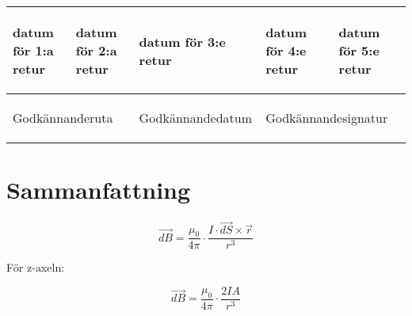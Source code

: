 \documentclass[a4paper,10pt]{article}
\def\firstret{}
\def\secondret{}
\def\thirdret{}
\def\fourthret{}
\def\fifthret{}
\begin{document}
\begin{titlepage}
\begin{center}
\begin{large}
\begin{tabular}{rl}
			\end{tabular}
		\end{large}
		\vfill
		\begin{small}
		\begin{tabular}{||p{20mm}|p{20mm}|p{20mm}|p{20mm}|p{20mm}||}\hline
			\begin{tiny} datum för 1:a retur\end{tiny} \firstret &
			\begin{tiny} datum för 2:a retur\end{tiny} \secondret &
			\begin{tiny} datum för 3:e retur\end{tiny} \thirdret &
			\begin{tiny} datum för 4:e retur\end{tiny} \fourthret &
			\begin{tiny} datum för 5:e retur\end{tiny} \fifthret \\[7mm] \hline
			\multicolumn{2}{||p{40mm}|}{\begin{tiny} Godkännanderuta\end{tiny}}  &
			\tiny{\begin{tiny} Godkännandedatum\end{tiny}} &
			\multicolumn{2}{|p{40mm}||}{\begin{tiny} Godkännandesignatur\end{tiny}} \\[7mm] \hline
		\end{tabular}
		\end{small}
	\end{center}
\end{titlepage}

\pagebreak
\tableofcontents\pagebreak

\section{Sammanfattning}
\[ \vec{dB}=\frac{\mu_0}{4\pi}\cdot \frac{I\cdot \vec{dS}\times \vec{r}}{r^3} \]

För z-axeln: 

\[ \vec{dB}=\frac{\mu_0}{4\pi}\cdot \frac{2IA}{r^3} \]
\end{document}
